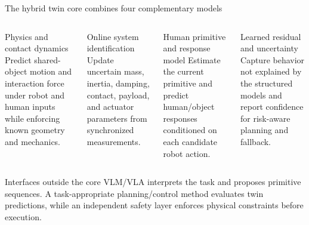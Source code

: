 \documentclass[aspectratio=169,11pt]{beamer}
\begin{document}
\begin{frame}{The hybrid twin core combines four complementary models}
\begin{columns}[T,onlytextwidth]
\begin{block}{Physics and contact dynamics}
Predict shared-object motion and interaction force under robot and human inputs while enforcing known geometry and mechanics.
\end{block}
\begin{block}{Online system identification}
Update uncertain mass, inertia, damping, contact, payload, and actuator parameters from synchronized measurements.
\end{block}
\begin{block}{Human primitive and response model}
Estimate the current primitive and predict human/object responses conditioned on each candidate robot action.
\end{block}
\begin{block}{Learned residual and uncertainty}
Capture behavior not explained by the structured models and report confidence for risk-aware planning and fallback.
\end{block}
\end{columns}
\begin{alertblock}{Interfaces outside the core}
VLM/VLA interprets the task and proposes primitive sequences. A task-appropriate planning/control method evaluates twin predictions, while an independent safety layer enforces physical constraints before execution.
\end{alertblock}
\end{frame}
\end{document}
